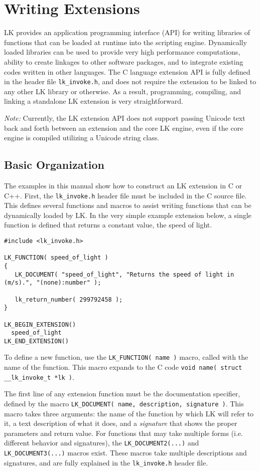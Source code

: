 \documentclass{article}
\begin{document}
\section{Writing Extensions}

LK provides an application programming interface (API) for writing libraries of functions that can be loaded at runtime into the scripting engine.  Dynamically loaded libraries can be used to provide very high performance computations, ability to create linkages to other software packages, and to integrate existing codes written in other languages.  The C language extension API is fully defined in the header file \texttt{lk\_invoke.h}, and does not require the extension to be linked to any other LK library or otherwise.  As a result, programming, compiling, and linking a standalone LK extension is very straightforward.  

\emph{Note:} Currently, the LK extension API does not support passing Unicode text back and forth between an extension and the core LK engine, even if the core engine is compiled utilizing a Unicode string class.

\subsection{Basic Organization}

The examples in this manual show how to construct an LK extension in C or C++.  First, the \texttt{lk\_invoke.h} header file must be included in the C source file.  This defines several functions and macros to assist writing functions that can be dynamically loaded by LK.  In the very simple example extension below, a single function is defined that returns a constant value, the speed of light.  

\begin{verbatim}
#include <lk_invoke.h>

LK_FUNCTION( speed_of_light )
{
   LK_DOCUMENT( "speed_of_light", "Returns the speed of light in (m/s).", "(none):number" );

   lk_return_number( 299792458 );
}

LK_BEGIN_EXTENSION()
  speed_of_light
LK_END_EXTENSION()
\end{verbatim}

To define a new function, use the \texttt{LK\_FUNCTION( name )} macro, called with the name of the function.  This macro expands to the C code \texttt{void name( struct \_\_lk\_invoke\_t *lk )}.

The first line of any extension function must be the documentation specifier, defined by the macro \texttt{LK\_DOCUMENT( name, description, signature )}.  This macro takes three arguments: the name of the function by which LK will refer to it, a text description of what it does, and a \emph{signature} that shows the proper parameters and return value.  For functions that may take multiple forms (i.e. different behavior and signatures), the \texttt{LK\_DOCUMENT2(...)} and \texttt{LK\_DOCUMENT3(...)} macros exist.  These macros take multiple descriptions and signatures, and are fully explained in the \texttt{lk\_invoke.h} header file.
\end{document}
